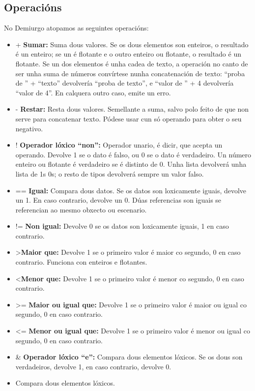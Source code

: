 \subsection{Operacións}
No Demiurgo atopamos as seguintes operacións:
\begin{itemize}
  \item + {\bf Sumar:} Suma dous valores. Se os dous elementos son enteiros, o
  resultado é un enteiro; se un é flotante e o outro enteiro ou flotante, o
  resultado é un flotante. Se un dos elementos é unha cadea de texto, a
  operación no canto de ser unha suma de números convírtese nunha concatenación
  de texto: ``proba de '' + ``texto'' devolvería ``proba de texto'', e ``valor
  de '' + 4 devolvería ``valor de 4''. En calquera outro caso, emite un erro.
  \item - {\bf Restar:} Resta dous valores. Semellante a suma, salvo polo feito
  de que non serve para concatenar texto. Pódese usar cun só operando para obter
  o seu negativo.
  \item ! {\bf Operador lóxico ``non'':} Operador unario, é dicir, que acepta un
  operando. Devolve 1 se o dato é falso, ou 0 se o dato é verdadeiro. Un número
  enteiro ou flotante é verdadeiro se é distinto de 0. Unha lista devolverá unha
  lista de 1s  0s; o resto de tipos devolverá sempre un valor falso.
  \item == {\bf Igual:} Compara dous datos. Se os datos son loxicamente iguais,
  devolve un 1. En caso contrario, devolve un 0. Dúas referencias son iguais se
  referencian ao mesmo obxecto ou escenario.
  \item != {\bf Non igual:} Devolve 0 se os datos son loxicamente iguais, 1 en
  caso contrario.
  \item \textgreater {\bf Maior que:} Devolve 1 se o primeiro valor é maior co
  segundo, 0 en caso contrario. Funciona con enteiros e flotantes.
  \item \textless {\bf Menor que:} Devolve 1 se o primeiro valor é menor co
  segundo, 0 en caso contrario.
  \item \textgreater= {\bf Maior ou igual que:} Devolve 1 se o primeiro valor é maior ou
  igual co segundo, 0 en caso contrario.
  \item \textless= {\bf Menor ou igual que:} Devolve 1 se o primeiro valor é
  menor ou igual co segundo, 0 en caso contrario.
  \item \& {\bf Operador lóxico ``e'':} Compara dous elementos lóxicos. Se os
  dous son verdadeiros, devolve 1, en caso contrario, devolve 0.
  \item {} Compara dous elementos lóxicos.

\end{itemize}
